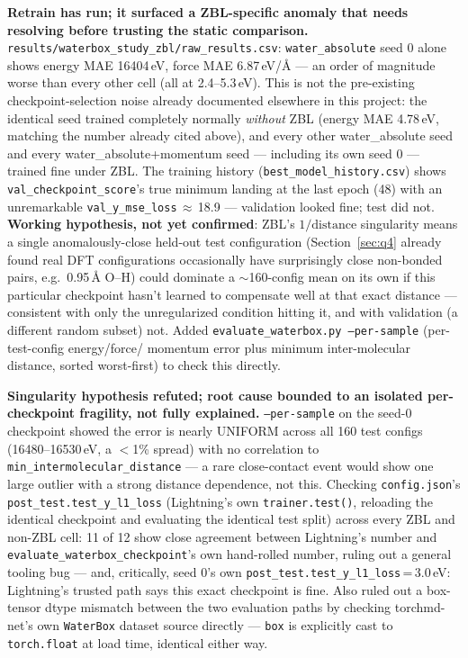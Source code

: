 \documentclass[11pt]{article}
\begin{document}
\textbf{Retrain has run; it surfaced a ZBL-specific anomaly that needs
resolving before trusting the static comparison.}
\texttt{results/waterbox\_study\_zbl/raw\_results.csv}: \texttt{water\_absolute}
seed 0 alone shows energy MAE 16404\,eV, force MAE 6.87\,eV/\AA{} ---
an order of magnitude worse than every other cell (all at 2.4--5.3\,eV). This
is not the pre-existing checkpoint-selection noise already documented
elsewhere in this project: the identical seed trained completely normally
\emph{without} ZBL (energy MAE 4.78\,eV, matching the number already cited
above), and every other water\_absolute seed and every
water\_absolute+momentum seed --- including its own seed 0 --- trained fine
under ZBL. The training history
(\texttt{best\_model\_history.csv}) shows \texttt{val\_checkpoint\_score}'s
true minimum landing at the last epoch (48) with an unremarkable
\texttt{val\_y\_mse\_loss}\,$\approx$\,18.9 --- validation looked fine; test
did not. \textbf{Working hypothesis, not yet confirmed}: ZBL's
$1/\text{distance}$ singularity means a single anomalously-close held-out
test configuration (Section~\ref{sec:q4} already found real DFT
configurations occasionally have surprisingly close non-bonded pairs, e.g.\
0.95\,\AA{} O--H) could dominate a $\sim$160-config mean on its own if this
particular checkpoint hasn't learned to compensate well at that exact
distance --- consistent with only the unregularized condition hitting it,
and with validation (a different random subset) not. Added
\texttt{evaluate\_waterbox.py --per-sample} (per-test-config energy/force/
momentum error plus minimum inter-molecular distance, sorted worst-first) to
check this directly.

\textbf{Singularity hypothesis refuted; root cause bounded to an isolated
per-checkpoint fragility, not fully explained.} \texttt{--per-sample} on the
seed-0 checkpoint showed the error is nearly UNIFORM across all 160 test
configs (16480--16530\,eV, a $<$1\% spread) with no correlation to
\texttt{min\_intermolecular\_distance} --- a rare close-contact event would
show one large outlier with a strong distance dependence, not this. Checking
\texttt{config.json}'s \texttt{post\_test.test\_y\_l1\_loss} (Lightning's own
\texttt{trainer.test()}, reloading the identical checkpoint and evaluating
the identical test split) across every ZBL and non-ZBL cell: 11 of 12 show
close agreement between Lightning's number and
\texttt{evaluate\_waterbox\_checkpoint}'s own hand-rolled number, ruling out
a general tooling bug --- and, critically, seed 0's own
\texttt{post\_test.test\_y\_l1\_loss}\,=\,3.0\,eV: Lightning's trusted path
says this exact checkpoint is fine. Also ruled out a box-tensor dtype
mismatch between the two evaluation paths by checking torchmd-net's own
\texttt{WaterBox} dataset source directly --- \texttt{box} is explicitly cast
to \texttt{torch.float} at load time, identical either way.
\end{document}
